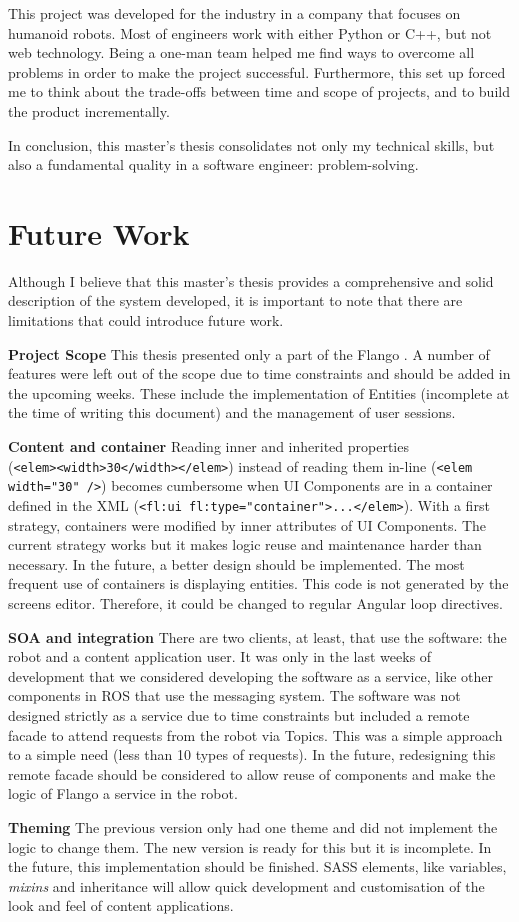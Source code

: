 This project was developed for the industry in a company that focuses on humanoid robots.
Most of engineers work with either Python or C++, but not web technology.
Being a one-man team helped me find ways to overcome all problems in order to make the project successful.
Furthermore, this set up forced me to think about the trade-offs between time and scope of projects, and to build the product incrementally.

In conclusion, this master's thesis consolidates not only my technical skills, but also a fundamental quality in a software engineer: problem-solving.


\section{Future Work}
Although I believe that this master's thesis provides a comprehensive and solid description of the system developed, it is important to note that there are limitations that could introduce future work.

\textbf{Project Scope} This thesis presented only a part of the Flango \cm . 
A number of features were left out of the scope due to time constraints and should be added in the upcoming weeks.
These include the implementation of Entities (incomplete at the time of writing this document) and the management of user sessions.

\textbf{Content and container} Reading inner and inherited properties \\(\lstinline$<elem><width>30</width></elem>$) instead of reading them in-line (\lstinline$<elem width="30" />$) becomes cumbersome when UI Components are in a container defined in the \ac{XML} (\lstinline$<fl:ui fl:type="container">...</elem>$).
With a first strategy, containers were modified by inner attributes of UI Components.
The current strategy works but it makes logic reuse and maintenance harder than necessary.
In the future, a better design should be implemented.
The most frequent use of containers is displaying entities.
This code is not generated by the screens editor. 
Therefore, it could be changed to regular Angular loop directives.

\textbf{SOA and integration} There are two clients, at least, that use the software: the robot and a content application user.
It was only in the last weeks of development that we considered developing the software as a service, like other components in \ac{ROS} that use the messaging system.
The software was not designed strictly as a service due to time constraints but included a remote facade to attend requests from the robot via Topics.
This was a simple approach to a simple need (less than 10 types of requests).
In the future, redesigning this remote facade should be considered to allow reuse of components and make the logic of Flango \cm a service in the robot.

\textbf{Theming} The previous version only had one theme and did not implement the logic to change them.
The new version is ready for this but it is incomplete.
In the future, this implementation should be finished.
\ac{SASS} elements, like variables, \textit{mixins} and inheritance will allow quick development and customisation of the look and feel of content applications.
